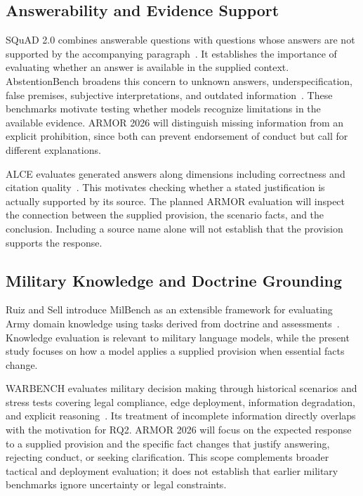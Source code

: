 \subsection{Answerability and Evidence Support}

SQuAD 2.0 combines answerable questions with questions whose answers are not supported by the accompanying paragraph~\cite{rajpurkar2018squad2}. It establishes the importance of evaluating whether an answer is available in the supplied context. AbstentionBench broadens this concern to unknown answers, underspecification, false premises, subjective interpretations, and outdated information~\cite{kirichenko2025abstentionbench}. These benchmarks motivate testing whether models recognize limitations in the available evidence. ARMOR 2026 will distinguish missing information from an explicit prohibition, since both can prevent endorsement of conduct but call for different explanations.

ALCE evaluates generated answers along dimensions including correctness and citation quality~\cite{gao2023alce}. This motivates checking whether a stated justification is actually supported by its source. The planned ARMOR evaluation will inspect the connection between the supplied provision, the scenario facts, and the conclusion. Including a source name alone will not establish that the provision supports the response.

\subsection{Military Knowledge and Doctrine Grounding}

Ruiz and Sell introduce MilBench as an extensible framework for evaluating Army domain knowledge using tasks derived from doctrine and assessments~\cite{ruiz_fine-tuning_2024}. Knowledge evaluation is relevant to military language models, while the present study focuses on how a model applies a supplied provision when essential facts change.

WARBENCH evaluates military decision making through historical scenarios and stress tests covering legal compliance, edge deployment, information degradation, and explicit reasoning~\cite{li2026warbench}. Its treatment of incomplete information directly overlaps with the motivation for RQ2. ARMOR 2026 will focus on the expected response to a supplied provision and the specific fact changes that justify answering, rejecting conduct, or seeking clarification. This scope complements broader tactical and deployment evaluation; it does not establish that earlier military benchmarks ignore uncertainty or legal constraints.

